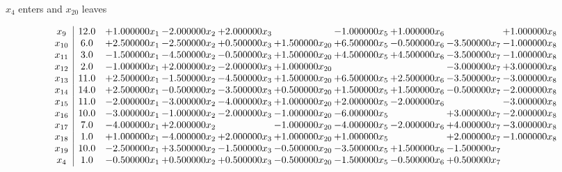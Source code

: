 \documentclass[10pt]{article}
\begin{document}
 $ x_{4} $ enters and $ x_{20} $ leaves 

 \[\begin{array}{c| c c@{\hskip 2pt} c@{\hskip 2pt} c@{\hskip 2pt} c@{\hskip 2pt} c@{\hskip 2pt} c@{\hskip 2pt} c@{\hskip 2pt} c@{\hskip 2pt} }
 x_{9}   &  12.0 & + 1.000000 x_{1} & -2.000000 x_{2} & + 2.000000 x_{3} &   & -1.000000 x_{5} & + 1.000000 x_{6} &   & + 1.000000 x_{8}\\
 x_{10}   &  6.0 & + 2.500000 x_{1} & -2.500000 x_{2} & + 0.500000 x_{3} & + 1.500000 x_{20} & + 6.500000 x_{5} & -0.500000 x_{6} & -3.500000 x_{7} & -1.000000 x_{8}\\
 x_{11}   &  3.0 & -1.500000 x_{1} & -4.500000 x_{2} & -0.500000 x_{3} & + 1.500000 x_{20} & + 4.500000 x_{5} & + 4.500000 x_{6} & -3.500000 x_{7} & -1.000000 x_{8}\\
 x_{12}   &  2.0 & -1.000000 x_{1} & + 2.000000 x_{2} & -2.000000 x_{3} & + 1.000000 x_{20} &    &   & -3.000000 x_{7} & + 3.000000 x_{8}\\
 x_{13}   &  11.0 & + 2.500000 x_{1} & -1.500000 x_{2} & -4.500000 x_{3} & + 1.500000 x_{20} & + 6.500000 x_{5} & + 2.500000 x_{6} & -3.500000 x_{7} & -3.000000 x_{8}\\
 x_{14}   &  14.0 & + 2.500000 x_{1} & -0.500000 x_{2} & -3.500000 x_{3} & + 0.500000 x_{20} & + 1.500000 x_{5} & + 1.500000 x_{6} & -0.500000 x_{7} & -2.000000 x_{8}\\
 x_{15}   &  11.0 & -2.000000 x_{1} & -3.000000 x_{2} & -4.000000 x_{3} & + 1.000000 x_{20} & + 2.000000 x_{5} & -2.000000 x_{6} &   & -3.000000 x_{8}\\
 x_{16}   &  10.0 & -3.000000 x_{1} & -1.000000 x_{2} & -2.000000 x_{3} & -1.000000 x_{20} & -6.000000 x_{5} &   & + 3.000000 x_{7} & -2.000000 x_{8}\\
 x_{17}   &  7.0 & -4.000000 x_{1} & + 2.000000 x_{2} &   & -1.000000 x_{20} & -4.000000 x_{5} & -2.000000 x_{6} & + 4.000000 x_{7} & -3.000000 x_{8}\\
 x_{18}   &  1.0 & + 1.000000 x_{1} & -4.000000 x_{2} & + 2.000000 x_{3} & + 1.000000 x_{20} & + 1.000000 x_{5} &   & + 2.000000 x_{7} & -1.000000 x_{8}\\
 x_{19}   &  10.0 & -2.500000 x_{1} & + 3.500000 x_{2} & -1.500000 x_{3} & -0.500000 x_{20} & -3.500000 x_{5} & + 1.500000 x_{6} & -1.500000 x_{7} &   \\
 x_{4}   &  1.0 & -0.500000 x_{1} & + 0.500000 x_{2} & + 0.500000 x_{3} & -0.500000 x_{20} & -1.500000 x_{5} & -0.500000 x_{6} & + 0.500000 x_{7} &   \\

\end{array}\]
\end{document}
